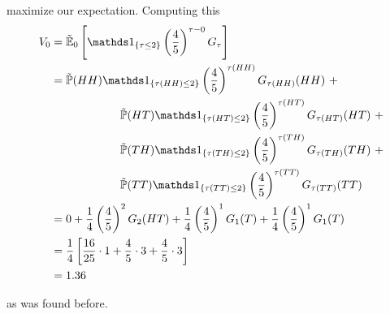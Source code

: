 \documentclass[12pt]{article}
\renewcommand{\P}{\mathbb P}
\newcommand{\E}{\mathbb E}
\begin{document}
maximize our expectation. Computing this
\begin{align*}
	V_0 &= \tilde{\E}_0 \left[ \mathds 1_{\{\tau \leq 2\}} \left(\frac{4}{5}\right)^{\tau - 0} G_{\tau} \right] \\
	&= \tilde{\P}(HH)\mathds 1_{\{\tau(HH) \leq 2\}} \left(\frac{4}{5}\right)^{\tau(HH)} G_{\tau(HH)}(HH)~+ \\
	&\hphantom{{}={-----}} \tilde{\P}(HT)\mathds 1_{\{\tau(HT) \leq 2\}} \left(\frac{4}{5}\right)^{\tau(HT)} G_{\tau(HT)}(HT)~+ \\
	&\hphantom{{}={-----}} \tilde{\P}(TH)\mathds 1_{\{\tau(TH) \leq 2\}} \left(\frac{4}{5}\right)^{\tau(TH)} G_{\tau(TH)}(TH)~+ \\
	&\hphantom{{}={-----}} \tilde{\P}(TT)\mathds 1_{\{\tau(TT) \leq 2\}} \left(\frac{4}{5}\right)^{\tau(TT)} G_{\tau(TT)}(TT) \\
	&= 0 + \frac{1}{4}\left(\frac{4}{5}\right)^2G_2(HT) + \frac{1}{4}\left(\frac{4}{5}\right)^1G_1(T) + \frac{1}{4}\left(\frac{4}{5}\right)^1G_1(T) \\
	&= \frac{1}{4}\left[ \frac{16}{25}\cdot 1 + \frac{4}{5}\cdot3 + \frac{4}{5}\cdot 3 \right] \\
	&= 1.36
\end{align*}

as was found before. \\
\end{document}
